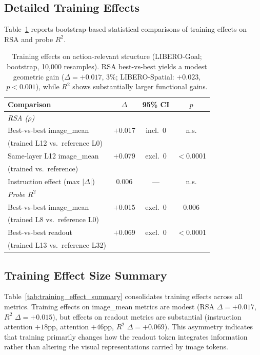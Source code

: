 \subsection{Detailed Training Effects}
Table~\ref{tab:training_effects} reports bootstrap-based statistical comparisons of training effects on RSA and probe $R^2$.

\begin{table}[h]
\centering
\caption{Training effects on action-relevant structure (LIBERO-Goal; bootstrap, 10{,}000 resamples). RSA best-vs-best yields a modest geometric gain ($\Delta{=}+0.017$, $3\%$; LIBERO-Spatial: $+0.023$, $p{<}0.001$), while $R^2$ shows substantially larger functional gains.}
\label{tab:training_effects}
\small
\begin{tabular}{lccc}
\toprule
\textbf{Comparison} & \textbf{$\Delta$} & \textbf{95\% CI} & \textbf{$p$} \\
\midrule
\multicolumn{4}{l}{\emph{RSA ($\rho$)}} \\
Best-vs-best image\_mean & $+$0.017 & incl.\ 0 & n.s. \\
\quad (trained L12 vs.\ reference L0) & & & \\
Same-layer L12 image\_mean & $+$0.079 & excl.\ 0 & $<$0.0001 \\
\quad (trained vs.\ reference) & & & \\
Instruction effect (max $|\Delta|$) & 0.006 & --- & n.s. \\
\midrule
\multicolumn{4}{l}{\emph{Probe $R^2$}} \\
Best-vs-best image\_mean & $+$0.015 & excl.\ 0 & 0.006 \\
\quad (trained L8 vs.\ reference L0) & & & \\
Best-vs-best readout & $+$0.069 & excl.\ 0 & $<$0.0001 \\
\quad (trained L13 vs.\ reference L32) & & & \\
\bottomrule
\end{tabular}
\end{table}

\subsection{Training Effect Size Summary}
Table~\ref{tab:training_effect_summary} consolidates training effects across all metrics.
Training effects on image\_mean metrics are modest (RSA $\Delta = +0.017$, $R^2$ $\Delta = +0.015$), but effects on readout metrics are substantial (instruction attention $+18$pp, attention $+46$pp, $R^2$ $\Delta = +0.069$).
This asymmetry indicates that training primarily changes how the readout token integrates information rather than altering the visual representations carried by image tokens.

